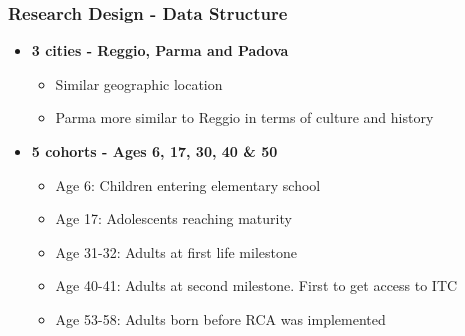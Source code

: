 \begin{frame}
\frametitle{Research Design - Data Structure} 
\begin{itemize}
	\item \textbf{3 cities - Reggio, Parma and Padova}
	\begin{itemize}
		\item Similar geographic location
		\item Parma more similar to Reggio in terms of culture and history
	\end{itemize}
	\bigskip
	\item \textbf{5 cohorts - Ages 6, 17, 30, 40 \&  50}
	\begin{itemize}
		\item Age 6: Children entering elementary school
		\item Age 17: Adolescents reaching maturity
		\item Age 31-32: Adults at first life milestone
		\item Age 40-41: Adults at second milestone. First to get access to ITC
		\item Age 53-58: Adults born before RCA was implemented
	\end{itemize}
\end{itemize}
\end{frame} 
